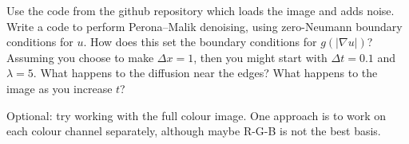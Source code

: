 \documentclass[12pt,a4paper]{article}
\begin{document}
Use the code from the github repository which loads the image and adds
noise.  Write a code to perform Perona--Malik denoising, using zero-Neumann boundary conditions for $u$. How does this set the boundary conditions for $g(|\nabla u|)$? Assuming you choose to make $\Delta x = 1$, then you might start with $\Delta t = 0.1$
and $\lambda = 5$. What happens to the diffusion near the edges? What happens to the image as you increase $t$?

Optional: try working with the full colour image.  One approach is to
work on each colour channel separately, although maybe R-G-B is not
the best basis.




\end{document}
